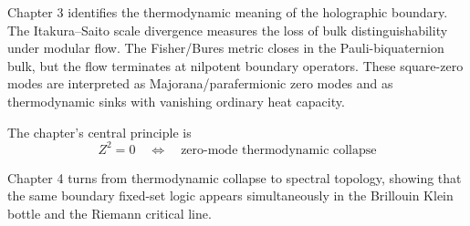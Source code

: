 Chapter 3 identifies the thermodynamic meaning of the holographic boundary.  The Itakura--Saito scale divergence measures the loss of bulk distinguishability under modular flow.  The Fisher/Bures metric closes in the Pauli-biquaternion bulk, but the flow terminates at nilpotent boundary operators.  These square-zero modes are interpreted as Majorana/parafermionic zero modes and as thermodynamic sinks with vanishing ordinary heat capacity.

The chapter's central principle is
\begin{equation}
    \boxed{
    Z^2=0
    \quad\Longleftrightarrow\quad
    \text{zero-mode thermodynamic collapse}
    }
\end{equation}

Chapter 4 turns from thermodynamic collapse to spectral topology, showing that the same boundary fixed-set logic appears simultaneously in the Brillouin Klein bottle and the Riemann critical line.
